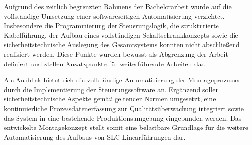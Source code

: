 Aufgrund des zeitlich begrenzten Rahmens der Bachelorarbeit wurde auf die vollständige Umsetzung einer softwareseitigen Automatisierung verzichtet. Insbesondere die Programmierung der Steuerungslogik, die strukturierte Kabelführung, der Aufbau eines vollständigen Schaltschrankkonzepts sowie die sicherheitstechnische Auslegung des Gesamtsystems konnten nicht abschließend realisiert werden. Diese Punkte wurden bewusst als Abgrenzung der Arbeit definiert und stellen Ansatzpunkte für weiterführende Arbeiten dar.

Als Ausblick bietet sich die vollständige Automatisierung des Montageprozesses durch die Implementierung der Steuerungssoftware an. Ergänzend sollen sicherheitstechnische Aspekte gemäß geltender Normen umgesetzt, eine kontinuierliche Prozessdatenerfassung zur Qualitätsüberwachung integriert sowie das System in eine bestehende Produktionsumgebung eingebunden werden. Das entwickelte Montagekonzept stellt somit eine belastbare Grundlage für die weitere Automatisierung des Aufbaus von SLC-Linearführungen dar.
